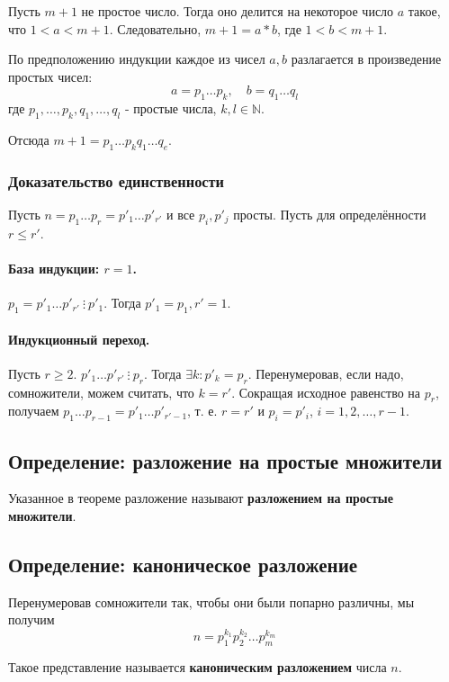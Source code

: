 \documentclass{article}
\newcommand{\divs}{~\vdots~}
\begin{document}
Пусть $m+1$ не простое число. Тогда оно делится на некоторое число $a$ такое, что $1 < a < m+1$. Следовательно, $m + 1 = a * b$, где $1 < b < m+1$.

По предположению индукции каждое из чисел $a, b$ разлагается в произведение простых чисел:
\[a = p_1 \dots p_k, \quad b = q_1 \dots q_l\]
где $p_1, \dots, p_k, q_1, \dots, q_l$ - простые числа, $k, l \in \mathbb N$.

Отсюда $m + 1 = p_1 \dots p_k q_1 \dots q_e$.
\subsubsection{Доказательство единственности}
Пусть $n = p_1 \dots p_r = p'_1 \dots p'_{r'}$ и все $p_i, p'_j$ просты. Пусть для определённости $r \leq r'$.
\paragraph{База индукции: $r = 1$.}
$p_1 = p'_1 \dots p'_{r'} \divs p'_1$. Тогда $p'_1 = p_1, r' = 1$.
\paragraph{Индукционный переход.}
Пусть $r \geq 2$. $p'_1 \dots p'_{r'} \divs p_r$. Тогда $\exists k : p'_k = p_r$. Перенумеровав, если надо, сомножители, можем считать, что $k = r'$. Сокращая исходное равенство на $p_r$, получаем $p_1 \dots p_{r-1} = p'_1 \dots p'_{r' - 1}$, т. е. $r = r'$ и $p_i = p'_i$, $i = 1, 2, \dots, r-1$.

\subsection{Определение: разложение на простые множители}
Указанное в теореме разложение называют \textbf{разложением на простые множители}.

\subsection{Определение: каноническое разложение}
Перенумеровав сомножители так, чтобы они были попарно различны, мы получим
\[n = p_1^{k_1} p_2^{k_2} \dots p_m^{k_m}\]

Такое представление называется \textbf{каноническим разложением} числа $n$.
\end{document}
